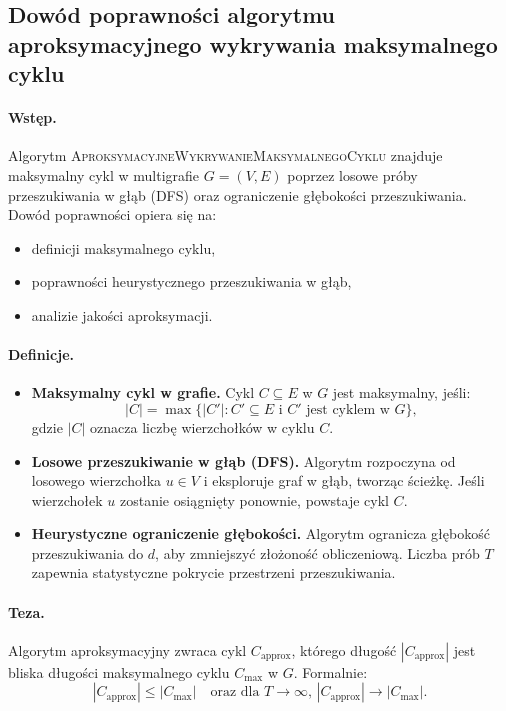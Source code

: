 \subsection{Dowód poprawności algorytmu aproksymacyjnego wykrywania maksymalnego cyklu}

\paragraph{Wstęp.}
Algorytm \textsc{AproksymacyjneWykrywanieMaksymalnegoCyklu} znajduje maksymalny cykl w multigrafie \( G = (V, E) \) poprzez losowe próby przeszukiwania w głąb (DFS) oraz ograniczenie głębokości przeszukiwania. Dowód poprawności opiera się na:
\begin{itemize}
    \item definicji maksymalnego cyklu,
    \item poprawności heurystycznego przeszukiwania w głąb,
    \item analizie jakości aproksymacji.
\end{itemize}

\paragraph{Definicje.}
\begin{itemize}
    \item \textbf{Maksymalny cykl w grafie.} Cykl \( C \subseteq E \) w \( G \) jest maksymalny, jeśli:
    \[
    |C| = \max\{|C'| : C' \subseteq E \text{ i } C' \text{ jest cyklem w } G\},
    \]
    gdzie \( |C| \) oznacza liczbę wierzchołków w cyklu \( C \).

    \item \textbf{Losowe przeszukiwanie w głąb (DFS).} Algorytm rozpoczyna od losowego wierzchołka \( u \in V \) i eksploruje graf w głąb, tworząc ścieżkę. Jeśli wierzchołek \( u \) zostanie osiągnięty ponownie, powstaje cykl \( C \).

    \item \textbf{Heurystyczne ograniczenie głębokości.} Algorytm ogranicza głębokość przeszukiwania do \( d \), aby zmniejszyć złożoność obliczeniową. Liczba prób \( T \) zapewnia statystyczne pokrycie przestrzeni przeszukiwania.
\end{itemize}

\paragraph{Teza.}
Algorytm aproksymacyjny zwraca cykl \( C_{\text{approx}} \), którego długość \( |C_{\text{approx}}| \) jest bliska długości maksymalnego cyklu \( C_{\text{max}} \) w \( G \). Formalnie:
\[
|C_{\text{approx}}| \leq |C_{\text{max}}| \quad \text{oraz dla } T \to \infty, \, |C_{\text{approx}}| \to |C_{\text{max}}|.
\]

